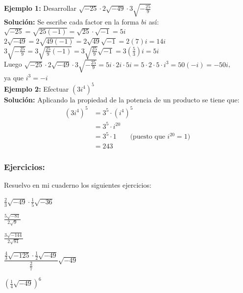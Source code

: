 \documentclass[letterpaper,11pt,twoside]{article}
\begin{document}
\begin{multicols}{2}
  \textbf{Ejemplo 1:} Desarrollar $ \sqrt{-25}\cdot 2\sqrt{-49}\cdot 3\sqrt{-\frac{25}{9}} $\\
  
  \textbf{Solución:} Se escribe cada factor en la forma $ bi $ así:\\
  
  $ \sqrt{-25}=\sqrt{25(-1)}=\sqrt{25}\cdot\sqrt{-1}=5i $\\
  
  $ 2\sqrt{-49}=2\sqrt{49(-1)}=2\sqrt{49}\sqrt{-1}=2(7)i=14i $\\
  
  $ 3\sqrt{-\frac{25}{9}}=3\sqrt{\frac{25}{9}(-1)}=3\sqrt{\frac{25}{9}}\sqrt{-1}=3(\frac{5}{3})i=5i $\\
  
  Luego \qquad $ \sqrt{-25}\cdot2\sqrt{-49}\cdot3\sqrt{-\frac{25}{9}}=5i\cdot2i\cdot5i=5\cdot2\cdot5\cdot i^3= 50(-i)=-50i $,\\
  ya que $ i^3=-i $\\
  
  \textbf{Ejemplo 2:} Efectuar $ (3i^4)^5 $\\
  
  \textbf{Solución:} Aplicando la propiedad de la potencia de un producto se tiene que:
  \begin{align*}
    (3i^4)^5&=3^5\cdot(i^4)^5\\
    &=3^5\cdot i^{20}\\
    &=3^5\cdot1 \qquad \text{(puesto que } i^{20}=1)\\
    &=243
  \end{align*}
  \subsubsection*{Ejercicios:}
  Resuelvo en mi cuaderno los siguientes ejercicios:
  \begin{enumerate}\begin{multicols}{2}
    \item $ \frac{2}{3}\sqrt{-49}\cdot\frac{1}{5}\sqrt{-36} $
    \item $ \frac{5\sqrt{-81}}{2\sqrt{9}} $
    \item $ \frac{3\sqrt{-144}}{2\sqrt{81}} $
    \item $ \dfrac{\frac{4}{3}\sqrt{-125}\cdot\frac{1}{2}\sqrt{-49}}{\frac{2}{7}}\sqrt{-49} $
    \item $ (\frac{1}{4}\sqrt{-49})^6 $
  \end{multicols} 
    \end{enumerate}
  \end{multicols}  
\end{document}
